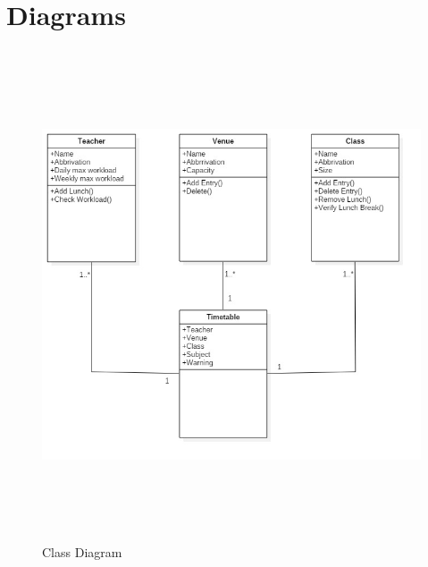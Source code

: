 \documentclass[a4paper,12pt,onecolumn]{report}
\begin{document}






\thispagestyle{empty}
\tableofcontents
%
%
%
%


%

\listoffigures
{}

\newpage
{}









\chapter{Diagrams}

\begin{figure}[ht!]
	\centering
	\includegraphics[height=145mm, width=130mm]{classd.jpg}
	\caption{Class Diagram}
\end{figure}
\end{document}
